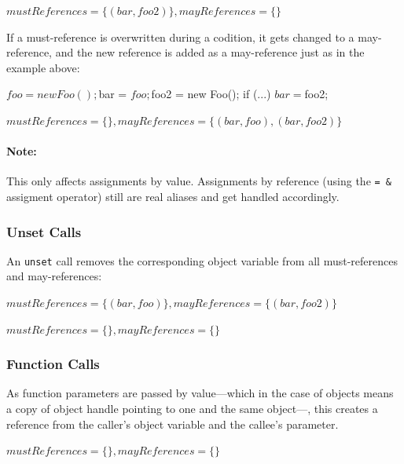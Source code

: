 $mustReferences = \{(bar, foo2)\}, mayReferences = \{\}$

If a must-reference is overwritten during a codition, it gets changed to a may-reference, and the new reference is added as a may-reference just as in the example above:

\begin{phpcode}
$foo = new Foo();
$bar = $foo;

$foo2 = new Foo();
if (...) {
  $bar = $foo2;
}
\end{phpcode}

$mustReferences = \{\}, mayReferences = \{(bar, foo), (bar, foo2)\}$

\paragraph{Note:} This only affects assignments by value. Assignments by reference (using the \texttt{=~\&} assigment operator) still are real aliases and get handled accordingly.


\subsubsection{Unset Calls}

An \texttt{unset} call removes the corresponding object variable from all must-references and may-references:

$mustReferences = \{(bar, foo)\}, mayReferences = \{(bar, foo2)\}$


$mustReferences = \{\}, mayReferences = \{\}$


\subsubsection{Function Calls}

As function parameters are passed by value---which in the case of objects means a copy of object handle pointing to one and the same object---, this creates a reference from the caller's object variable and the callee's parameter.

$mustReferences = \{\}, mayReferences = \{\}$

\begin{phpcode}
function someFunction() {
  $foo = new Foo();
  otherFunction(foo);
}

function otherFunction(Foo $foo) {
\end{phpcode}

